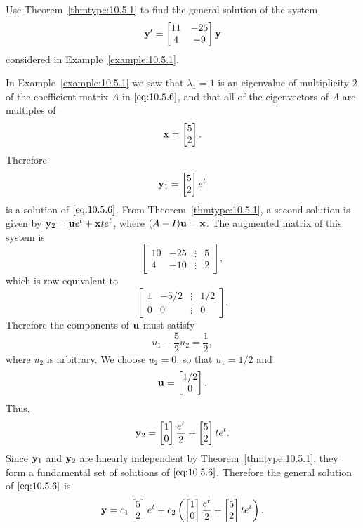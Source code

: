 \documentclass{ximera}
\begin{document}
\begin{example}\label{example:10.5.2}
Use Theorem~\ref{thmtype:10.5.1} to find the general solution of the system
\begin{equation}\label{eq:10.5.6}
{\bf y}'=\begin{bmatrix}11&-25\\4&-9\end{bmatrix}{\bf y}
\end{equation}
considered in Example~\ref{example:10.5.1}.

\begin{explanation} 
In Example~\ref{example:10.5.1} we saw that $\lambda_1=1$ is an
eigenvalue of multiplicity $2$ of the coefficient matrix $A$ in
$\eqref{eq:10.5.6}$, and that all of the eigenvectors of $A$ are multiples of
$$
{\bf x}=\begin{bmatrix}5\\2\end{bmatrix}.
$$
Therefore
$$
{\bf y}_1=\begin{bmatrix}5\\2\end{bmatrix}e^t
$$
is a solution of $\eqref{eq:10.5.6}$. From Theorem~\ref{thmtype:10.5.1}, a second
solution is given by ${\bf y}_2={\bf u}e^t+{\bf x}te^t$, where
$(A-I){\bf u}={\bf x}$. The augmented matrix of this system is
$$
\begin{bmatrix}10&-25&\vdots&5\\4&-10&\vdots&2\end{bmatrix},
$$
which is row equivalent to
$$
\begin{bmatrix}1&-5/2&\vdots&1/2\\
0&0&\vdots&0\end{bmatrix}.
$$
Therefore the components of ${\bf u}$ must satisfy
$$
u_1-\frac{5}{2}u_2=\frac{1}{2},
$$
where  $u_2$ is arbitrary. We choose $u_2=0$, so that $u_1=1/2$ and
$$
{\bf u}=\begin{bmatrix}1/2\\0\end{bmatrix}.
$$
Thus,
$$
{\bf y}_2=\begin{bmatrix}1\\0\end{bmatrix}\frac{e^t}{2}+\begin{bmatrix}5\\2\end{bmatrix}te^t.
$$
Since ${\bf y}_1$ and ${\bf y}_2$ are linearly independent by
Theorem~\ref{thmtype:10.5.1}, they form a fundamental set of solutions of
$\eqref{eq:10.5.6}$. Therefore the general solution of $\eqref{eq:10.5.6}$ is
$$
{\bf
y}=c_1\begin{bmatrix}5\\2\end{bmatrix}e^t+c_2\left(\begin{bmatrix}1\\0\end{bmatrix}\frac{e^t}{2}+\begin{bmatrix}5\\2\end{bmatrix}te^t\right).
$$
\end{explanation}
\end{example}
\end{document}
